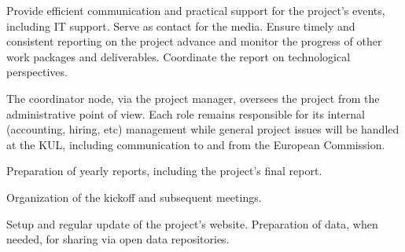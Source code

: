 \begin{workpackage}[id=management,type=MGT,wphases=0-48!.2,
  title=Project Management,short=Management,
  lead=KUL,KULRM=24]

\begin{wpobjectives}

Provide efficient communication and practical support for the project's events,
including IT support.
%
Serve as contact for the media.
%
Ensure timely and consistent reporting on the project advance and monitor the
progress of other work packages and deliverables.
%
Coordinate the report on technological perspectives.

\end{wpobjectives}

\begin{wpdescription}

The coordinator node, via the project manager, oversees the project from the
administrative point of view. Each role remains responsible for its internal
(accounting, hiring, etc) management while general project issues will be
handled at the KUL, including communication to and from the European Commission.

\end{wpdescription}

\begin{tasklist}
\begin{task}[title=Reporting,id=mgt-reporting,lead=KUL,PM=6,wphases=0-48!0.125]

Preparation of yearly reports, including the project's final report.

\end{task}

\begin{task}[title=Meetings,id=mgt-meetings,lead=KUL,PM=6,wphases=0-48!0.125]

Organization of the kickoff and subsequent meetings.

\end{task}

\begin{task}[title=IT,id=mgt-IT,lead=KUL,PM=6,wphases=0-48!0.125]

Setup and regular update of the project's website.
%
Preparation of data, when needed, for sharing via open data repositories.

\end{task}

\begin{task}[title=comm,id=mgt-comm,lead=KUL,PM=6,wphases=0-48!0.125]


\end{task}
\end{tasklist}
\end{workpackage}
